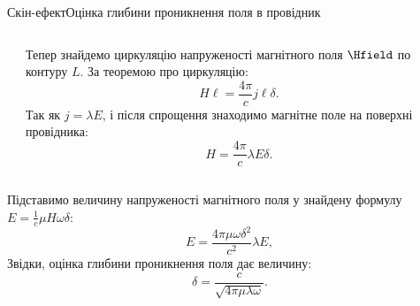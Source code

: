 \documentclass{beamer}
\begin{document}
\begin{frame}{Скін-ефект}{Оцінка глибини проникнення поля в провідник}
\begin{onlyenv}
\begin{columns}
\begin{column}{0.3\linewidth}
			\end{column}
			\begin{column}{0.7\linewidth}
				\begin{block}{}\justifying
					Тепер знайдемо циркуляцію напруженості
					магнітного поля \textcolor{blue}{$\Hfield$} по контуру \textcolor{green!60!black}{$L$}. За теоремою про циркуляцію:
					\begin{equation*}
						H \ell = \frac{4\pi}{c} j \ell \delta.
					\end{equation*}
					Так як $j = \lambda E$, і після спрощення знаходимо магнітне поле на поверхні провідника:
					\begin{equation*}
						H = \frac{4\pi}{c} \lambda E \delta.
					\end{equation*}
				\end{block}
			\end{column}
		\end{columns}
		\begin{block}{}\justifying
			Підставимо величину напруженості магнітного поля у знайдену формулу $E = \frac1c \mu H\omega \delta$:
			\begin{equation*}
				E =  \frac{4\pi\mu\omega \delta^2}{c^2} \lambda E,
			\end{equation*}
			Звідки, оцінка глибини проникнення поля дає величину:
			\begin{equation*}
				\delta = \frac{c}{\sqrt{4\pi\mu\lambda\omega}}.
			\end{equation*}
		\end{block}
	\end{onlyenv}
\end{frame}
\end{document}
